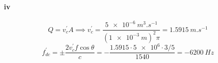 \paragraph{iv}
\begin{equation}
    Q = v_c^{'} A \implies v_c^{'} = \frac{\SI{5e-6}{m^3.s^{-1}}}{ {(\SI{1e-3}{m})}^2\pi } = \SI{1.5915}{m.s^{-1}}
\end{equation}
\begin{equation}
    f_{dc}^{'} = \pm \frac{ 2v^{'}_c f \cos \theta }{ c } = - \frac{1.5915 \cdot \num{5e6} \cdot 3/5}{1540} = - \SI{6200}{Hz}
\end{equation}